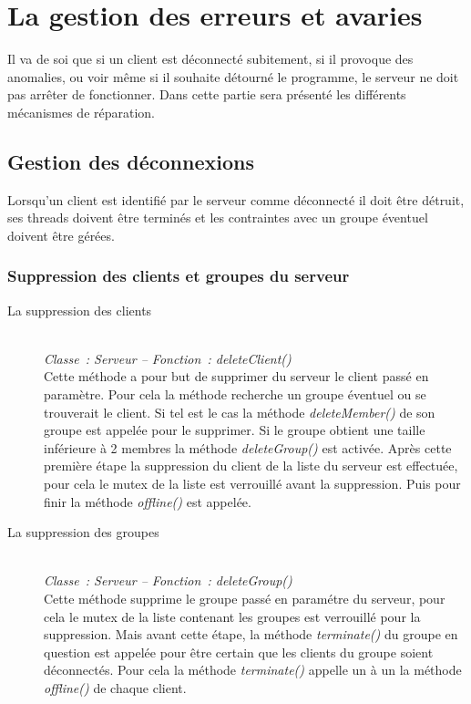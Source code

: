 \documentclass[a4paper,11pt]{report}
\begin{document}
\section{La gestion des erreurs et avaries}
  Il va de soi que si un client est déconnecté subitement, si il provoque des anomalies, ou voir même si il souhaite détourné le programme, le serveur ne doit pas arrêter de fonctionner. Dans cette partie sera présenté les différents mécanismes de réparation.

\subsection{Gestion des déconnexions}
  Lorsqu’un client est identifié par le serveur comme déconnecté il doit être détruit, ses threads doivent être terminés et les contraintes avec un groupe éventuel doivent être gérées.

\subsubsection{Suppression des clients et groupes du serveur}

\begin{description}
  \item[La suppression des clients]
  \textit{\\Classe : Serveur – Fonction : deleteClient()\\}
    Cette méthode a pour but de supprimer du serveur le client passé en paramètre. Pour cela la méthode recherche un groupe éventuel ou se trouverait le client. Si tel est le cas la méthode \textit{deleteMember()} de son groupe est appelée pour le supprimer. Si le groupe obtient une taille inférieure à 2 membres la méthode  \textit{deleteGroup()} est activée.
Après cette première étape la suppression du client de la liste du serveur est effectuée, pour cela le mutex de la liste est verrouillé avant la suppression. Puis pour finir la méthode \textit{offline()} est appelée.
   
   \item[La suppression des groupes]
   \textit{\\Classe : Serveur – Fonction : deleteGroup()\\}
   Cette méthode supprime le groupe passé en paramétre du serveur, pour cela le mutex de la liste contenant les groupes est verrouillé pour la suppression. Mais avant cette étape, la méthode \textit{terminate()} du groupe en question est appelée pour être certain que les clients du groupe soient déconnectés. Pour cela la méthode \textit{terminate()} appelle un à un la méthode \textit{offline()} de chaque client.
\end{description}
\end{document}
